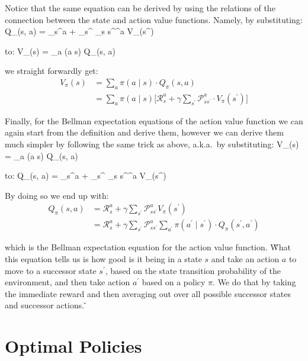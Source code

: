 Notice that the same equation can be derived by using the relations of the connection between the state and action
value functions. Namely, by substituting:
\bse
Q_{\pi}(s, a) = _{s}^{a} + \gamma \sum_{s^{\prime}} _{s s^\prime}^{a} V_{\pi}(s^\prime)
\ese

to:
\bse
V_{\pi}(s) = \sum_{a} \pi(a \mid s) \cdot Q_{\pi}(s, a)
\ese

we straight forwardly get:
\begin{align*}
V_{\pi}(s) &= \sum_{a} \pi(a \mid s) \cdot Q_{\pi}(s, a) \\
&=\sum_{a} \pi(a \mid s) \Big[\mathcal{R}_{s}^{a} +
\gamma \sum_{s^\prime} \mathcal{P}_{ss^\prime}^{a} \cdot V_{\pi}(s^\prime) \Big]
\end{align*}

Finally, for the Bellman expectation equations of the action value function we can again start from the definition and
derive them, however we can derive them much simpler by following the same trick as above, a.k.a.\ by substituting:
\bse
V_{\pi}(s) = \sum_{a} \pi(a \mid s) \cdot Q_{\pi}(s, a)
\ese

to:
\bse
Q_{\pi}(s, a) = _{s}^{a} + \gamma \sum_{s^{\prime}} _{s s^\prime}^{a} V_{\pi}(s^\prime)
\ese

By doing so we end up with:
\begin{align*}
Q_{\pi}(s, a) &= \mathcal{R}_{s}^{a} + \gamma \sum_{s^{\prime}} \mathcal{P}_{s s^\prime}^{a} V_{\pi}(s^\prime) \\
&= \mathcal{R}_{s}^{a} + \gamma \sum_{s^{\prime}} \mathcal{P}_{s s^\prime}^{a}
\sum_{a^\prime} \pi(a^\prime \mid s^\prime) \cdot Q_{\pi}(s^\prime, a^\prime)
\end{align*}

which is the Bellman expectation equation for the action value function. \v

What this equation tells us is how good is it being in a state $s$ and take an action $a$ to move to a successor
state $s^\prime$, based on the state transition probability of the environment, and then take action $a^\prime$ based
on a policy $\pi$. We do that by taking the immediate reward and then averaging out over all possible successor
states and successor actions. \v


\section{Optimal Policies}

